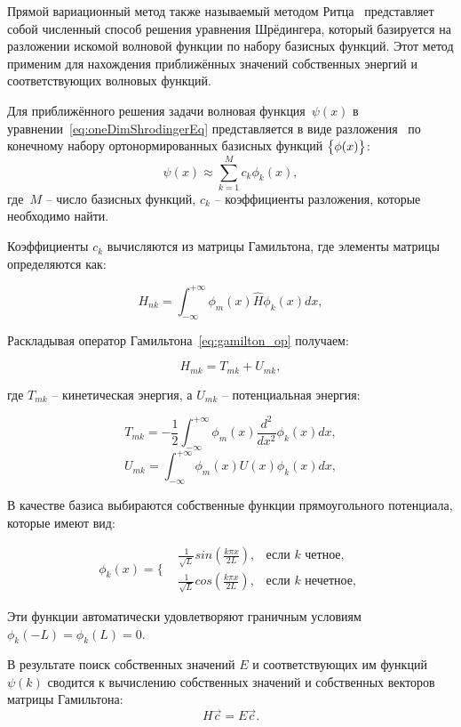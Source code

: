 Прямой вариационный метод также называемый методом Ритца~\cite{dav} представляет собой численный способ решения уравнения Шрёдингера, который базируется на разложении искомой волновой функции по набору базисных функций.
Этот метод применим для нахождения приближённых значений собственных энергий и соответствующих волновых функций.


Для приближённого решения задачи волновая функция~$\psi(x)$ в уравнении~\eqref{eq:oneDimShrodingerEq} представляется в виде разложения~\cite{tim_lectures} по конечному набору ортонормированных базисных функций $\big{\{}\phi(x)\big{\}}$:
\begin{equation}
    \label{eq:ortonorm_basis_func}
    \psi(x)\approx\sum_{k=1}^{M}c_k \phi_k(x),
\end{equation}
где~$M$ -- число базисных функций, $c_k$ -- коэффициенты разложения, которые необходимо найти.


Коэффициенты $c_k$ вычисляются из матрицы Гамильтона, где элементы матрицы определяются как:

\begin{equation}
    \label{eq:gamilton_matrix}
    H_{nk}=\int_{-\infty}^{+\infty}\phi_m(x)\hat{H}\phi_k(x)dx,
\end{equation}

Раскладывая оператор Гамильтона~\eqref{eq:gamilton_op} получаем:

\begin{equation}
    \label{eq:gamilton_op_components}
    H_{mk}=T_{mk}+U_{mk},
\end{equation}

где $T_{mk}$ -- кинетическая энергия, а $U_{mk}$ -- потенциальная энергия:

\begin{equation}
    \label{eq:gamilton_kinetic_e}
    T_{mk}=-\frac{1}{2}\int_{-\infty}^{+\infty}\phi_m(x)\frac{d^2}{dx^2}\phi_k(x)dx,
\end{equation}
\begin{equation}
    \label{eq:gamilton_pot_e}
    U_{mk}=\int_{-\infty}^{+\infty}\phi_m(x)U(x)\phi_k(x)dx,
\end{equation}

В качестве базиса выбираются собственные функции прямоугольного потенциала, которые имеют вид:

\begin{equation}
    \label{eq:eigen_func}
    \phi_k(x)=\Biggl\{{
        \begin{aligned}
            &\frac{1}{\sqrt{L}}sin{(\frac{k\pi x}{2L})}, &\text{если $k$ четное},  \\
            &\frac{1}{\sqrt{L}}cos{(\frac{k\pi x}{2L})}, &\text{если $k$ нечетное},
        \end{aligned}
    }
\end{equation}

Эти функции автоматически удовлетворяют граничным условиям $\phi_k(-L)=\phi_k(L)=0$.


В результате поиск собственных значений $E$ и соответствующих им функций $\psi(k)$ сводится к вычислению собственных значений и собственных векторов матрицы Гамильтона:
\begin{equation}
    \label{eq:eigenvalues_gamilton_matrix}
    H\vec{c}=E\vec{c}.
\end{equation}